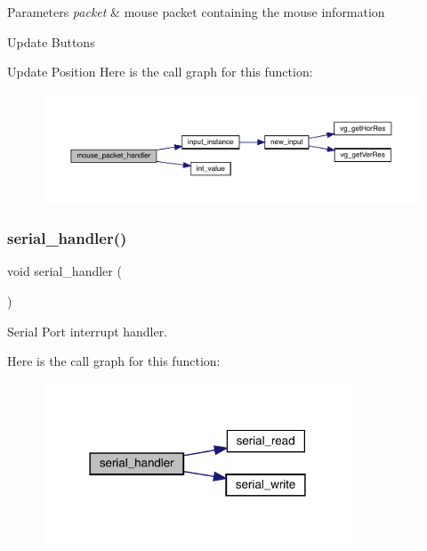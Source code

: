 \begin{DoxyParams}{Parameters}
{\em packet} & mouse packet containing the mouse information \\
\hline
\end{DoxyParams}
Update Buttons

Update Position Here is the call graph for this function\+:
\nopagebreak
\begin{figure}[H]
\begin{center}
\leavevmode
\includegraphics[width=350pt]{group___input_gaeeb5745202c4e6c62abee86ad62f36f6_cgraph}
\end{center}
\end{figure}
\hypertarget{group___input_gad26ccb83dbd3f35a93e991343682b843}{}\label{group___input_gad26ccb83dbd3f35a93e991343682b843} 
\subsubsection{\texorpdfstring{serial\+\_\+handler()}{serial\_handler()}}
{\footnotesize\ttfamily void serial\+\_\+handler (\begin{DoxyParamCaption}{ }\end{DoxyParamCaption})}



Serial Port interrupt handler. 

Here is the call graph for this function\+:
\nopagebreak
\begin{figure}[H]
\begin{center}
\leavevmode
\includegraphics[width=261pt]{group___input_gad26ccb83dbd3f35a93e991343682b843_cgraph}
\end{center}
\end{figure}
\hypertarget{group___input_gaaf4cb27460e9e5bfa6f46343518e89bf}{}\label{group___input_gaaf4cb27460e9e5bfa6f46343518e89bf} 
